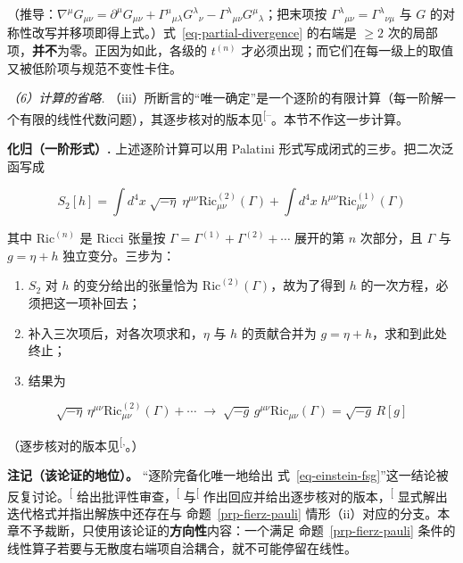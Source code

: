 \documentclass[
  chinese,
  a4paper,
  UTF8,
  12pt,
  oneside,
  openany]{ctexbook}
\providecommand{\tightlist}{%
  \setlength{\itemsep}{0pt}\setlength{\parskip}{0pt}}
\theoremstyle{plain}
\theoremstyle{plain}
\theoremstyle{plain}
\theoremstyle{definition}
\theoremstyle{plain}
\theoremstyle{plain}
\theoremstyle{remark}
\begin{document}
（推导：\(\nabla^{\mu}G_{\mu\nu}=\partial^{\mu}G_{\mu\nu}+\Gamma^{\mu}{}_{\mu\lambda}G^{\lambda}{}_{\nu}-\Gamma^{\lambda}{}_{\mu\nu}G^{\mu}{}_{\lambda}\)；把末项按
\(\Gamma^{\lambda}{}_{\mu\nu}=\Gamma^{\lambda}{}_{\nu\mu}\) 与 \(G\)
的对称性改写并移项即得上式。）式~\ref{eq-partial-divergence} 的右端是
\(\ge2\) 次的局部项，\textbf{并不}为零。正因为如此，各级的 \(t^{(n)}\)
才必须出现；而它们在每一级上的取值又被低阶项与规范不变性卡住。

\emph{（6）计算的省略.}
（iii）所断言的``唯一确定''是一个逐阶的有限计算（每一阶解一个有限的线性代数问题），其逐步核对的版本见\textsuperscript{{[}--\citeproc{ref-butcher2009}{22}{]}}。本节不作这一步计算。

\textbf{化归（一阶形式）.} 上述逐阶计算可以用 Palatini
形式写成闭式的三步。把二次泛函写成

\[
S_{2}[h]=\int d^{4}x\;\sqrt{-\eta}\;\eta^{\mu\nu}\mathrm{Ric}^{(2)}_{\mu\nu}(\Gamma)
+\int d^{4}x\;h^{\mu\nu}\mathrm{Ric}^{(1)}_{\mu\nu}(\Gamma)
\]

其中 \(\mathrm{Ric}^{(n)}\) 是 Ricci 张量按
\(\Gamma=\Gamma^{(1)}+\Gamma^{(2)}+\cdots\) 展开的第 \(n\) 次部分，且
\(\Gamma\) 与 \(g=\eta+h\) 独立变分。三步为：

\begin{enumerate}
\def\labelenumi{\arabic{enumi}.}
\tightlist
\item
  \(S_{2}\) 对 \(h\) 的变分给出的张量恰为
  \(\mathrm{Ric}^{(2)}(\Gamma)\)，故为了得到 \(h\)
  的一次方程，必须把这一项补回去；
\item
  补入三次项后，对各次项求和，\(\eta\) 与 \(h\) 的贡献合并为
  \(g=\eta+h\)，求和到此处终止；
\item
  结果为
\end{enumerate}

\[
\sqrt{-\eta}\,\eta^{\mu\nu}\mathrm{Ric}^{(2)}_{\mu\nu}(\Gamma)+\cdots
\;\longrightarrow\;
\sqrt{-g}\,g^{\mu\nu}\mathrm{Ric}_{\mu\nu}(\Gamma)=\sqrt{-g}\,R[g]
\]

（逐步核对的版本见\textsuperscript{{[},\citeproc{ref-deser2010}{21}{]}}。）

\textbf{注记（该论证的地位）。} ``逐阶完备化唯一地给出
式~\ref{eq-einstein-fsg}''这一结论被反复讨论。\textsuperscript{{[}\citeproc{ref-padmanabhan2008}{23}{]}}
给出批评性审查，\textsuperscript{{[}\citeproc{ref-deser2010}{21}{]}}
与\textsuperscript{{[}\citeproc{ref-butcher2009}{22}{]}}
作出回应并给出逐步核对的版本，\textsuperscript{{[}\citeproc{ref-barcelo2014}{16}{]}}
显式解出迭代格式并指出解族中还存在与 命题~\ref{prp-fierz-pauli}
情形（ii）对应的分支。本章不予裁断，只使用该论证的\textbf{方向性}内容：一个满足
命题~\ref{prp-fierz-pauli}
条件的线性算子若要与无散度右端项自洽耦合，就不可能停留在线性。
\end{document}
